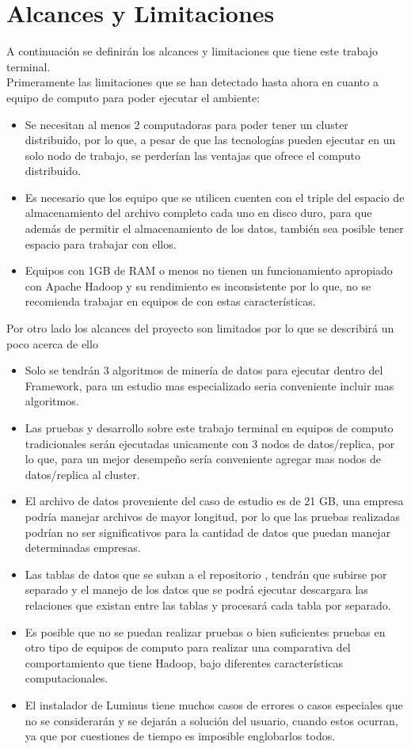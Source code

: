 \section{Alcances y Limitaciones}
A continuación se definirán los alcances y limitaciones que tiene este trabajo terminal.
\\ 
Primeramente las limitaciones que se han detectado hasta ahora en cuanto a equipo de computo para poder ejecutar el ambiente:
\begin{itemize}
	\item Se necesitan al menos 2 computadoras para poder tener un cluster distribuido, por lo que, a pesar de que las tecnologías pueden ejecutar en un solo nodo de trabajo, se perderían las ventajas que ofrece el computo distribuido.
	\item Es necesario que los equipo que se utilicen cuenten con el triple del espacio de almacenamiento del archivo completo cada uno en disco duro, para que además de permitir el almacenamiento de los datos, también sea posible tener espacio para trabajar con ellos.
	\item Equipos con 1GB de RAM o menos no tienen un funcionamiento apropiado con Apache Hadoop y su rendimiento es inconsistente por lo que, no se recomienda trabajar en equipos de con estas características.  
\end{itemize}
Por otro lado los alcances del proyecto son limitados por lo que se describirá un poco acerca de ello
\begin{itemize}
	\item Solo se tendrán 3 algoritmos de minería de datos para ejecutar dentro del Framework, para un estudio mas especializado seria conveniente incluir mas algoritmos.
	\item Las pruebas y desarrollo sobre este trabajo terminal en equipos de computo tradicionales serán ejecutadas unicamente con 3 nodos de datos/replica, por lo que, para un mejor desempeño sería conveniente agregar mas nodos de datos/replica al cluster.
	\item El archivo de datos proveniente del caso de estudio es de 21 GB, una empresa podría manejar archivos de mayor longitud, por lo que las pruebas realizadas podrían no ser significativos para la cantidad de datos que puedan manejar determinadas empresas. 
	\item Las tablas de datos que se suban a el repositorio , tendrán que subirse por separado y el manejo de los datos que se podrá ejecutar descargara las relaciones que existan entre las tablas y procesará cada tabla por separado.
	\item Es posible que no se puedan realizar pruebas o bien suficientes pruebas en otro tipo de equipos de computo para realizar una comparativa del comportamiento que tiene Hadoop, bajo diferentes características computacionales.
	\item El instalador de Luminus tiene muchos casos de errores o casos especiales que no se considerarán y se dejarán a solución del usuario, cuando estos ocurran, ya que por cuestiones de tiempo es imposible englobarlos todos.
	 
\end{itemize}